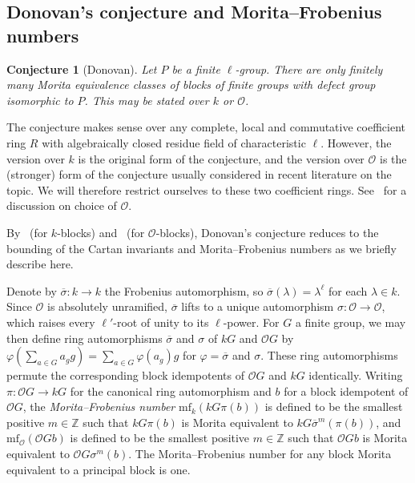 \documentclass{amsart}
\theoremstyle{plain}\newtheorem{Theorem}{Theorem}[section]
\theoremstyle{plain}\newtheorem{Conjecture}[Theorem]{Conjecture}
\theoremstyle{plain}\newtheorem{Corollary}[Theorem]{Corollary}
\theoremstyle{plain}\newtheorem{Lemma}[Theorem]{Lemma}
\theoremstyle{plain}\newtheorem{Proposition}[Theorem]{Proposition}
\theoremstyle{definition}\newtheorem{Definition}[Theorem]{Definition}
\theoremstyle{definition}\newtheorem{Example}[Theorem]{Example}
\theoremstyle{definition}\newtheorem{Examples}[Theorem]{Examples}
\theoremstyle{definition}\newtheorem{Exercise}[Theorem]{Exercise}
\theoremstyle{definition}\newtheorem{Notation}[Theorem]{Notation}
\theoremstyle{definition}\newtheorem{Remark}[Theorem]{Remark}
\theoremstyle{definition}\newtheorem{Remarks}[Theorem]{Remarks}
\def\CO{{\mathcal{O}}}    \def\OPE{{\mathcal{O}(P\rtimes E)}}
\def\mf{\mathrm{mf}}             \def\tenOGb{\otimes_{\mathcal{O}Gb}}
\numberwithin{equation}{section}
\begin{document}
\subsection{Donovan's conjecture and Morita--Frobenius numbers}

\begin{Conjecture}[Donovan]
Let $P$ be a finite $\ell$-group. There are only finitely many Morita equivalence classes of blocks of finite groups with defect group isomorphic to $P$. This may be stated over $k$ or $\CO$. 
\end{Conjecture}

The conjecture makes sense over any complete, local and commutative coefficient ring $R$ with algebraically closed residue field of characteristic $\ell$. However, the version over $k$ is the original form of the conjecture, and the version over $\CO$ is the (stronger) form of the conjecture usually considered in recent literature on the topic. We will therefore restrict ourselves to these two coefficient rings. See~\cite{eel20} for a discussion on choice of $\CO$.

By~\cite{ke04} (for $k$-blocks) and~\cite[Cor.~3.11]{eel20} (for $\CO$-blocks), Donovan's conjecture reduces to the bounding of the Cartan invariants and Morita--Frobenius numbers as we briefly describe here.

Denote by $\overline{\sigma}:k \rightarrow k$ the Frobenius automorphism, so $\overline{\sigma}(\lambda)=\lambda^\ell$ for each $\lambda\in k$. Since $\CO$ is absolutely unramified, $\overline{\sigma}$ lifts to a unique automorphism $\sigma: \CO \rightarrow \CO$, which raises every $\ell'$-root of unity to its $\ell$-power. For $G$ a finite group, we may then define ring automorphisms $\overline{\sigma}$ and $\sigma$ of $kG$ and $\CO G$ by $\varphi(\sum_{a \in G} a_gg)=\sum_{a \in G} \varphi(a_g)g$ for $\varphi=\overline{\sigma}$ and $\sigma$. These ring automorphisms permute the corresponding block idempotents of $\CO G$ and $kG$ identically. Writing $\pi:\CO G \rightarrow kG$ for the canonical ring automorphism and $b$ for a block idempotent of $\CO G$, the \emph{Morita--Frobenius number} $\mf_k(kG\pi(b))$ is defined to be the smallest positive $m \in \mathbb{Z}$ such that $kG\pi(b)$ is Morita equivalent to $kG\overline{\sigma}^m(\pi(b))$, and $\mf_\CO(\CO Gb)$ is defined to be the smallest positive $m \in \mathbb{Z}$ such that $\CO G b$ is Morita equivalent to $\CO G\sigma^m(b)$. The Morita--Frobenius number for any block Morita equivalent to a principal block is one.
\end{document}
